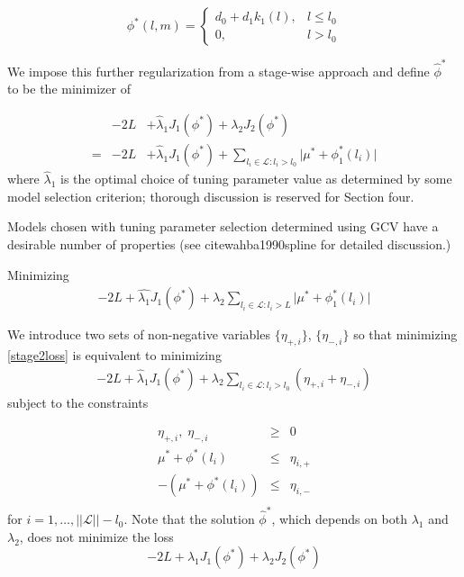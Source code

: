 \documentclass[12pt]{article}
\theoremstyle{definition}
\begin{document}
\[
\phi^*\left(l,m\right) = \left\{ \begin{array}{lr} d_0 + d_1 k_1\left(l\right), & l \le l_0 \\ 0, & l > l_0 \end{array} \right.
\]



We impose this further regularization from a stage-wise approach and define $\hat{\phi}^*$ to be the minimizer of 

\begin{eqnarray}
&-2L& + \hat{\lambda}_1J_1\left(\phi^*\right) + \lambda_2 J_2\left(\phi^*\right)\\
= &-2L& + \hat{\lambda}_1J_1\left(\phi^*\right) + \sum_{ l_i \in \mathcal{L}: l_i > l_0} \vert \mu^* + \phi^*_1\left(l_i\right) \vert  \label{stage2loss}
\end{eqnarray}
\noindent
where $\hat{\lambda}_1$ is the optimal choice of tuning parameter value as determined by some model selection criterion; thorough discussion is reserved for Section four.

Models chosen with tuning parameter selection determined using GCV have a desirable number of properties (see cite{wahba1990spline} for detailed discussion.)

Minimizing 
\begin{eqnarray}
-2L + \hat{\lambda_1}J_1\left(\phi^*\right) + \lambda_2 \sum_{  l_i \in \mathcal{L}: l_i > L} \vert \mu^* + \phi^*_1\left(l_i\right) \vert  \label{stage2loss}
\end{eqnarray}
\noindent

We introduce two sets of non-negative variables $\big \lbrace \eta_{+,i} \big \rbrace$, $\big \lbrace \eta_{-,i} \big \rbrace$ so that minimizing \eqref{stage2loss} is equivalent to minimizing 
\begin{eqnarray}
-2L + \hat{\lambda}_1J_1\left(\phi^*\right) + \lambda_2 \sum_{  l_i \in \mathcal{L}: l_i > l_0} \left( \eta_{+,i} + \eta_{-,i} \right)  \label{stage2loss}
\end{eqnarray}
\noindent subject to the constraints

\begin{eqnarray*}
\eta_{+,i},\; \eta_{-,i} &\ge& 0 \\
\mu^* + \phi^*\left(l_i\right) &\le& \eta_{i,+}\\
-\left(\mu^* + \phi^*\left(l_i\right)\right) &\le& \eta_{i,-}\label{eta_constraints}\\
\end{eqnarray*}
\noindent
for $i=1,\dots,\vert \vert\mathcal{L}\vert \vert-l_0$. Note that the solution $\hat{\phi}^*$, which depends on both $\lambda_1$ and $\lambda_2$, does not minimize the loss
\[
-2L + \lambda_1J_1\left(\phi^*\right) + \lambda_2J_2\left(\phi^*\right) 
\]
\noindent
\end{document}
